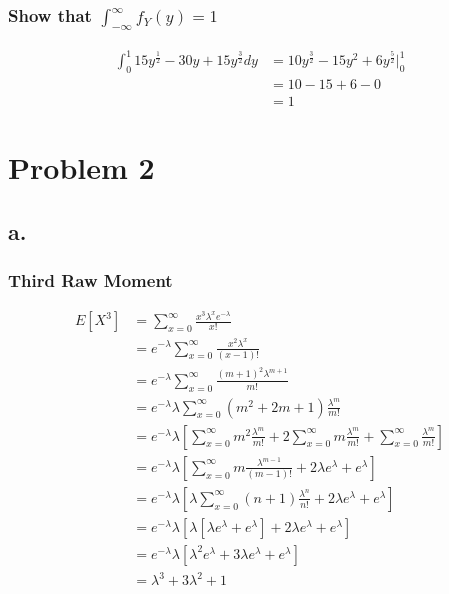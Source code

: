 \documentclass[12pt]{article}
\begin{document}
\subsubsection*{Show that $\int_{-\infty}^\infty f_Y(y) = 1$} 
\begin{align*}
  \int_0^1 15y^{\frac{1}{2}}-30y+15y^{\frac{3}{2}}dy
  &= 10y^{\frac{3}{2}}-15y^2+6y^{\frac{5}{2}}\big|_0^1 \\
  &= 10-15+6-0 \\
  &= 1
\end{align*}

\section*{Problem 2}

\subsection*{a.}

\subsubsection*{Third Raw Moment}
\begin{align*}
  E[X^3] &= \sum_{x=0}^\infty \frac{x^3\lambda^x e^{-\lambda}}{x!} \\
  &= e^{-\lambda} \sum_{x=0}^{\infty} \frac{x^2\lambda^x}{(x-1)!} \\
  &= e^{-\lambda} \sum_{x=0}^{\infty} \frac{(m+1)^2\lambda^{m+1}}{m!} \\
  &= e^{-\lambda}\lambda \sum_{x=0}^{\infty} (m^2+2m+1)\frac{\lambda^m}{m!} \\
  &= e^{-\lambda}\lambda \left[\sum_{x=0}^{\infty} m^2\frac{\lambda^m}{m!}
    + 2\sum_{x=0}^{\infty} m\frac{\lambda^m}{m!}
    + \sum_{x=0}^{\infty} \frac{\lambda^m}{m!}\right] \\
  &= e^{-\lambda}\lambda \left[\sum_{x=0}^{\infty} m\frac{\lambda^{m-1}}{(m-1)!}
    + 2\lambda e^{\lambda}
    + e^{\lambda}\right] \\
  &= e^{-\lambda}\lambda \left[\lambda\sum_{x=0}^{\infty} (n+1)\frac{\lambda^{n}}{n!}
    + 2\lambda e^{\lambda}
    + e^{\lambda}\right] \\
  &= e^{-\lambda}\lambda \left[\lambda\left[ \lambda e^{\lambda} + e^{\lambda} \right]
    + 2\lambda e^{\lambda}
    + e^{\lambda}\right] \\
  &= e^{-\lambda}\lambda \left[\lambda^2 e^{\lambda} + 3\lambda e^{\lambda} + e^{\lambda} \right] \\
  &= \lambda^3 + 3\lambda^2 + 1
\end{align*}
\end{document}
